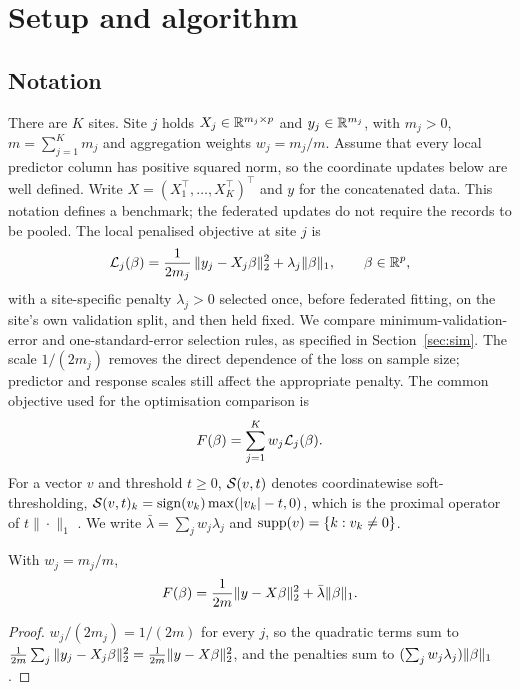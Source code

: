 \section{Setup and algorithm}
\label{sec:setup}

\subsection{Notation}

There are $K$ sites. Site $j$ holds $X_j \in \mathbb{R}^{m_j \times p}$ and
$y_j \in \mathbb{R}^{m_j}$, with $m_j>0$, $m = \sum_{j=1}^K m_j$ and
aggregation weights $w_j = m_j / m$. Assume that every local predictor
column has positive squared norm, so the coordinate updates below are
well defined. Write $X = (X_1^\top, \dots, X_K^\top)^\top$ and $y$ for
the concatenated data. This notation defines a benchmark; the federated
updates do not require the records to be pooled. The local penalised
objective at site $j$ is
\begin{equation}
\mathcal{L}_j(\beta)
 = \frac{1}{2 m_j}\, \| y_j - X_j \beta \|_2^2 + \lambda_j \|\beta\|_1 ,
\qquad \beta \in \mathbb{R}^p ,
\label{eq:local}
\end{equation}
with a site-specific penalty $\lambda_j > 0$ selected once, before
federated fitting, on the site's own validation split, and then held fixed.
We compare minimum-validation-error and one-standard-error selection
rules, as specified in Section~\ref{sec:sim}. The scale $1/(2m_j)$ removes
the direct dependence of the loss on sample size; predictor and response
scales still affect the appropriate penalty. The common objective used
for the optimisation comparison is
\begin{equation}
F(\beta) = \sum_{j=1}^K w_j \mathcal{L}_j(\beta) .
\label{eq:global}
\end{equation}
For a vector $v$ and threshold $t \ge 0$, $\mathcal{S}(v, t)$ denotes coordinatewise
soft-thresholding, $\mathcal{S}(v,t)_k = \operatorname{sign}(v_k)\max(|v_k| - t, 0)$, which is the
proximal operator of $t\|\cdot\|_1$ \citep{parikh2014}. We write
$\bar\lambda = \sum_j w_j \lambda_j$ and $\operatorname{supp}(v) = \{k : v_k \neq 0\}$.

\begin{lemma}
\label{lem:pooled}
With $w_j = m_j/m$,
\[
F(\beta)
 = \frac{1}{2m} \| y - X\beta \|_2^2 + \bar\lambda \|\beta\|_1 .
\]
\end{lemma}

\begin{proof}
$w_j / (2m_j) = 1/(2m)$ for every $j$, so the quadratic terms sum to
$\frac{1}{2m}\sum_j \|y_j - X_j\beta\|_2^2 = \frac{1}{2m}\|y - X\beta\|_2^2$,
and the penalties sum to $(\sum_j w_j \lambda_j)\|\beta\|_1$.
\end{proof}

